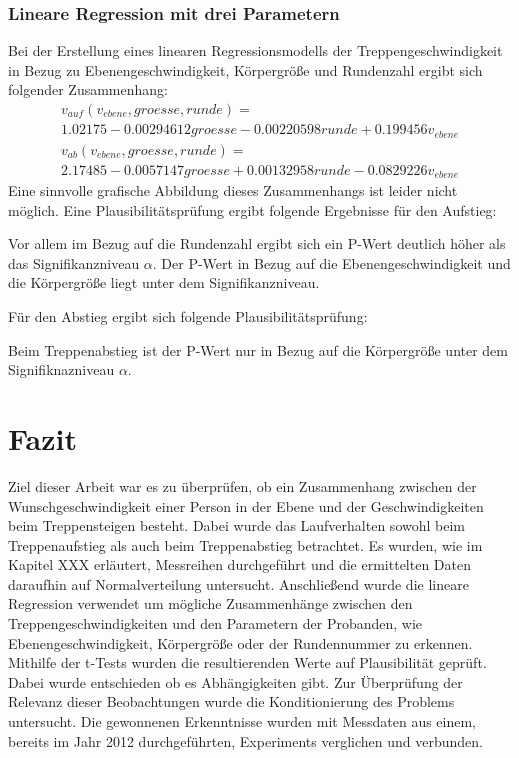 \subsubsection{Lineare Regression mit drei Parametern}
Bei der Erstellung eines linearen Regressionsmodells der Treppengeschwindigkeit in Bezug zu Ebenengeschwindigkeit, Körpergröße und Rundenzahl ergibt sich folgender Zusammenhang:
\begin{multline}
	v_{auf}(v_{ebene}, groesse, runde) = \\ 
	1.02175 -0.00294612 groesse -0.00220598 runde +0.199456 v_{ebene}
\end{multline}
\begin{multline}
	v_{ab}(v_{ebene}, groesse, runde ) = \\ 
	2.17485 -0.0057147 groesse+0.00132958 runde -0.0829226 v_{ebene}
\end{multline}
Eine sinnvolle grafische Abbildung dieses Zusammenhangs ist leider nicht möglich. 
Eine Plausibilitätsprüfung ergibt folgende Ergebnisse für den Aufstieg:

Vor allem im Bezug auf die Rundenzahl ergibt sich ein P-Wert deutlich höher als das Signifikanzniveau $\alpha$. Der P-Wert in Bezug auf die Ebenengeschwindigkeit und die Körpergröße liegt unter dem Signifikanzniveau.


Für den Abstieg ergibt sich folgende Plausibilitätsprüfung:

Beim Treppenabstieg ist der P-Wert nur in Bezug auf die Körpergröße unter dem Signifiknazniveau $\alpha$.

\section{Fazit}

Ziel dieser Arbeit war es zu überprüfen, ob ein Zusammenhang zwischen der Wunschgeschwindigkeit einer Person in der Ebene und der Geschwindigkeiten beim Treppensteigen besteht. Dabei wurde das Laufverhalten sowohl beim Treppenaufstieg als auch beim Treppenabstieg betrachtet. Es wurden, wie im Kapitel XXX erläutert, Messreihen durchgeführt und die ermittelten Daten daraufhin auf Normalverteilung untersucht. Anschließend wurde die lineare Regression verwendet um mögliche Zusammenhänge zwischen den Treppengeschwindigkeiten und den Parametern der Probanden, wie Ebenengeschwindigkeit, Körpergröße oder der Rundennummer zu erkennen. Mithilfe der t-Tests wurden die resultierenden Werte auf Plausibilität geprüft. Dabei wurde entschieden ob es Abhängigkeiten gibt. Zur Überprüfung der Relevanz dieser Beobachtungen wurde die Konditionierung des Problems untersucht. Die gewonnenen Erkenntnisse wurden mit Messdaten aus einem, bereits im Jahr 2012 durchgeführten, Experiments verglichen und verbunden.

